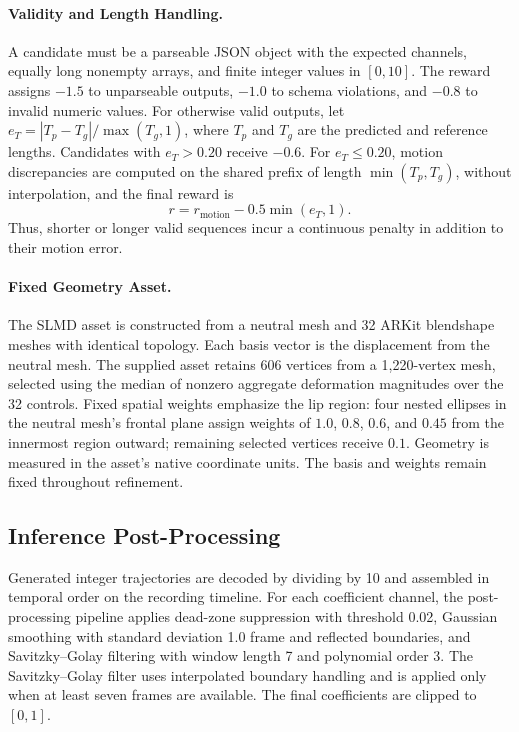 \paragraph{Validity and Length Handling.}
A candidate must be a parseable JSON object with the expected channels, equally long nonempty arrays, and finite integer values in $[0,10]$.
The reward assigns $-1.5$ to unparseable outputs, $-1.0$ to schema violations, and $-0.8$ to invalid numeric values.
For otherwise valid outputs, let $e_T=|T_p-T_g|/\max(T_g,1)$, where $T_p$ and $T_g$ are the predicted and reference lengths.
Candidates with $e_T>0.20$ receive $-0.6$.
For $e_T\leq0.20$, motion discrepancies are computed on the shared prefix of length $\min(T_p,T_g)$, without interpolation, and the final reward is
\begin{equation}
r=r_{\mathrm{motion}}-0.5\min(e_T,1).
\end{equation}
Thus, shorter or longer valid sequences incur a continuous penalty in addition to their motion error.

\paragraph{Fixed Geometry Asset.}
The SLMD asset is constructed from a neutral mesh and 32 ARKit blendshape meshes with identical topology.
Each basis vector is the displacement from the neutral mesh. The supplied asset retains 606 vertices from a 1,220-vertex mesh, selected using the median of nonzero aggregate deformation magnitudes over the 32 controls.
Fixed spatial weights emphasize the lip region: four nested ellipses in the neutral mesh's frontal plane assign weights of $1.0$, $0.8$, $0.6$, and $0.45$ from the innermost region outward; remaining selected vertices receive $0.1$.
Geometry is measured in the asset's native coordinate units. The basis and weights remain fixed throughout refinement.

\subsection{Inference Post-Processing}
\label{app:postprocessing}

Generated integer trajectories are decoded by dividing by 10 and assembled in temporal order on the recording timeline.
For each coefficient channel, the post-processing pipeline applies dead-zone suppression with threshold 0.02, Gaussian smoothing with standard deviation 1.0 frame and reflected boundaries, and Savitzky--Golay filtering with window length 7 and polynomial order 3.
The Savitzky--Golay filter uses interpolated boundary handling and is applied only when at least seven frames are available.
The final coefficients are clipped to $[0,1]$.

